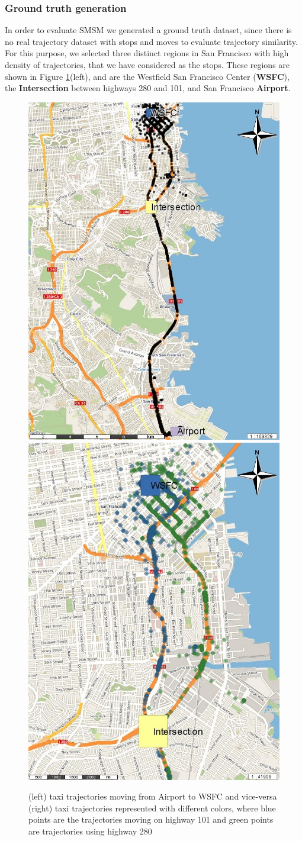 \documentclass[12pt]{article}
\begin{document}
\subsubsection{Ground truth generation}
In order to evaluate SMSM we generated a ground truth dataset, since there is no real trajectory dataset with stops and moves to evaluate trajectory similarity. For this purpose, we selected three distinct regions in San Francisco with high density of trajectories, that we have considered as the stops. These regions are shown in Figure \ref{fig:sanfrancisco_map_rois}(left), and are the Westfield San Francisco Center (\textbf{WSFC}), the \textbf{Intersection} between highways 280 and 101, and San Francisco \textbf{Airport}. 

\begin{figure}[ht!]
\centering
\includegraphics[width=.49\textwidth]{Images/CRAWDAD-Trajectories-Painted}
\includegraphics[width=.49\textwidth]{Images/CRAWDAD-Paths-Painted}
\caption{(left) {taxi} trajectories moving from Airport to WSFC and vice-versa (right) {taxi trajectories represented with different colors, where blue points are the trajectories moving on highway 101 and green points are trajectories using highway 280}}
\label{fig:sanfrancisco_map_rois}
\end{figure}
\end{document}
